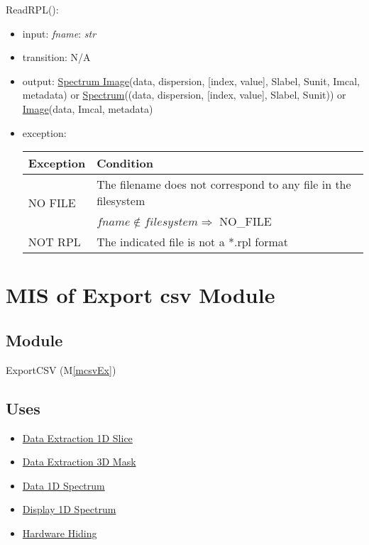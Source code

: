 \documentclass[12pt, titlepage]{article}
\newcommand{\mref}[1]{M\ref{#1}}
\begin{document}
\noindent ReadRPL():
\begin{itemize}
    \item input: \textit{fname}: \textit{str}
    \item transition: N/A
    \item output: \hyperref[Mod:SI]{Spectrum Image}(data, dispersion, [index,
    value], Slabel, Sunit, Imcal, metadata) or
    \hyperref[Mod:Spectrum]{Spectrum}((data, dispersion, [index, value], Slabel,
    Sunit)) or \hyperref[Mod:Image]{Image}(data, Imcal, metadata)
    \item exception: 
    \begin{center}
        \begin{tabular}{p{3cm} p{12cm}}
            \toprule[0.15em]
            \textbf{Exception} & \textbf{Condition}\\
            \midrule[0.1em]
            \multirow{2}{0.25\textwidth}{NO FILE} & The filename does not
            correspond to any file in the filesystem\\ 
            & $fname \notin filesystem \Rightarrow$ NO\_FILE\\ 
            \midrule[0.05em]
            NOT RPL & The indicated file is not a *.rpl format\\
            \bottomrule[0.15em]
        \end{tabular}
    \end{center}
\end{itemize}

\newpage
\section{MIS of Export csv Module} \label{Mod:ExportCSV}

\subsection{Module}

ExportCSV (\mref{mcsvEx})

\subsection{Uses}
\begin{itemize}
    \item \hyperref[Mod:Slice1D]{Data Extraction 1D Slice}
    \item \hyperref[Mod:Mask3D]{Data Extraction 3D Mask}
    \item \hyperref[Mod:Spectrum]{Data 1D Spectrum}
    \item \hyperref[Mod:Disp1D]{Display 1D Spectrum}
    \item \hyperref[Mod:HH]{Hardware Hiding}
\end{itemize}
\end{document}

